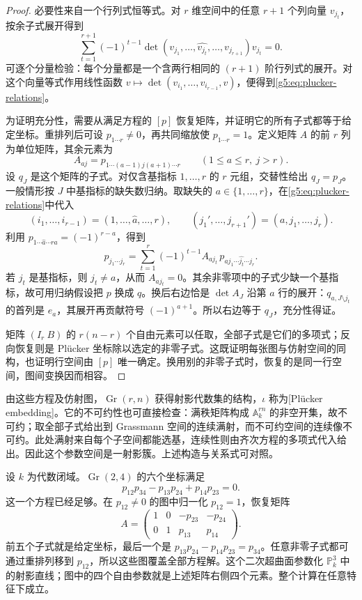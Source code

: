 \begin{proof}
	必要性来自一个行列式恒等式。对 \(r\) 维空间中的任意 \(r+1\) 个列向量 \(v_{j_t}\)，按余子式展开得到
	\[
		\sum_{t=1}^{r+1}(-1)^{t-1}
		\det(v_{j_1},\ldots,\widehat{v_{j_t}},\ldots,v_{j_{r+1}})v_{j_t}=0.
	\]
	可逐个分量检验：每个分量都是一个含两行相同的 \((r+1)\) 阶行列式的展开。对这个向量等式作用线性函数 \(v\mapsto\det(v_{i_1},\ldots,v_{i_{r-1}},v)\)，便得到\eqref{g5:eq:plucker-relations}。

	为证明充分性，需要从满足方程的 \([p]\) 恢复矩阵，并证明它的所有子式都等于给定坐标。重排列后可设 \(p_{1\cdots r}\ne0\)，再共同缩放使 \(p_{1\cdots r}=1\)。定义矩阵 \(A\) 的前 \(r\) 列为单位矩阵，其余元素为
	\[
		A_{aj}=p_{1\cdots(a-1)j(a+1)\cdots r}
		\qquad(1\leq a\leq r,\ j>r).
	\]
	设 \(q_J\) 是这个矩阵的子式。对仅含基指标 \(1,\ldots,r\) 的 \(r\) 元组，交替性给出 \(q_J=p_J\)。一般情形按 \(J\) 中基指标的缺失数归纳。取缺失的 \(a\in\{1,\ldots,r\}\)，在\eqref{g5:eq:plucker-relations}中代入
	\[
		(i_1,\ldots,i_{r-1})=(1,\ldots,\widehat a,\ldots,r),
		\qquad(j_1',\ldots,j_{r+1}')=(a,j_1,\ldots,j_r).
	\]
	利用 \(p_{1\cdots\widehat a\cdots r a}=(-1)^{r-a}\)，得到
	\[
		p_{j_1\cdots j_r}
		=\sum_{t=1}^r(-1)^{t-1}A_{a j_t}\,
		p_{a j_1\cdots\widehat{j_t}\cdots j_r}.
	\]
	若 \(j_t\) 是基指标，则 \(j_t\ne a\)，从而 \(A_{a j_t}=0\)。其余非零项中的子式少缺一个基指标，故可用归纳假设把 \(p\) 换成 \(q\)。换后右边恰是 \(\det A_J\) 沿第 \(a\) 行的展开：\(q_{a,J\setminus j_t}\) 的首列是 \(e_a\)，其展开再贡献符号 \((-1)^{a+1}\)。所以右边等于 \(q_J\)，充分性得证。

	矩阵 \((I_r\ B)\) 的 \(r(n-r)\) 个自由元素可以任取，全部子式是它们的多项式；反向恢复则是 Plücker 坐标除以选定的非零子式。这既证明每张图与仿射空间的同构，也证明行空间由 \([p]\) 唯一确定。换用别的非零子式时，恢复的是同一行空间，图间变换因而相容。
\end{proof}

由这些方程及仿射图，\(\operatorname{Gr}(r,n)\) 获得射影代数集的结构，\(\iota\) 称为[Plücker embedding]。它的不可约性也可直接检查：满秩矩阵构成 \(\mathbb A^{rn}_k\) 的非空开集，故不可约；取全部子式给出到 Grassmann 空间的连续满射，而不可约空间的连续像不可约。此处满射来自每个子空间都能选基，连续性则由齐次方程的多项式代入给出。因此这个参数空间是一射影簇。上述构造与关系式可对照\cite[第1章，第4节，例1.24，公式(1.24)]{Shafarevich2013Basic1}。

\begin{example}
\label{g5:exm:grassmann-24}
	设 \(k\) 为代数闭域。\(\operatorname{Gr}(2,4)\) 的六个坐标满足
	\[
		p_{12}p_{34}-p_{13}p_{24}+p_{14}p_{23}=0.
	\]
	这一个方程已经足够。在 \(p_{12}\ne0\) 的图中归一化 \(p_{12}=1\)，恢复矩阵
	\[
		A=\begin{pmatrix}
			1&0&-p_{23}&-p_{24}\\
			0&1&p_{13}&p_{14}
		\end{pmatrix}.
	\]
	前五个子式就是给定坐标，最后一个是 \(p_{13}p_{24}-p_{14}p_{23}=p_{34}\)。任意非零子式都可通过重排列移到 \(p_{12}\)，所以这些图覆盖全部方程解。这个二次超曲面参数化 \(\mathbb P^3_k\) 中的射影直线；图中的四个自由参数就是上述矩阵右侧四个元素。整个计算在任意特征下成立。
\end{example}

